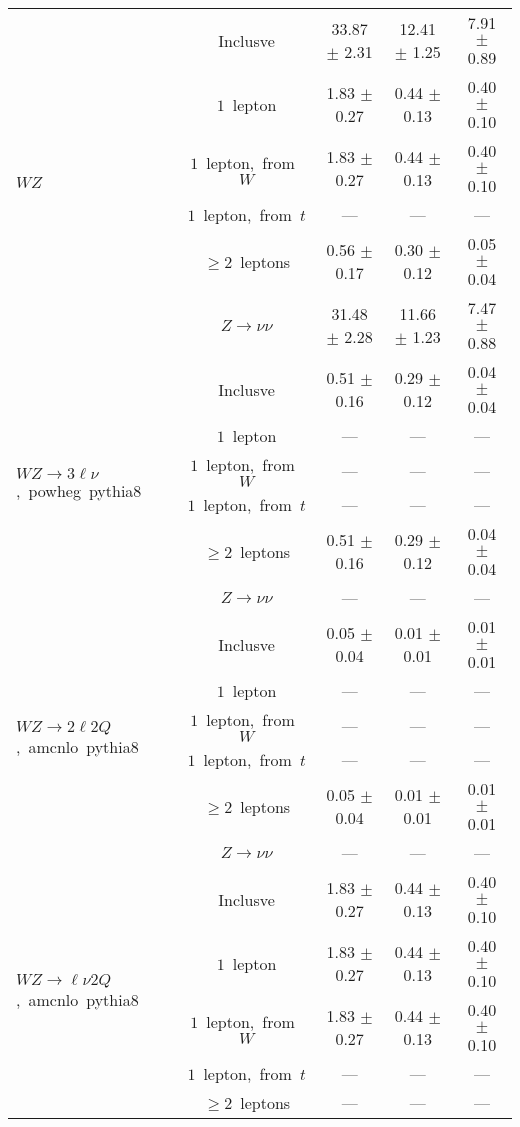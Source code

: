 \documentclass{article}
\begin{document}
\begin{longtable}{|l|c|c|c|c|}
\multirow{6}{*}{$WZ$} & Inclusve  & 33.87 $\pm$ 2.31  & 12.41 $\pm$ 1.25  & 7.91 $\pm$ 0.89 \\* 
 & $1$~lepton  & 1.83 $\pm$ 0.27  & 0.44 $\pm$ 0.13  & 0.40 $\pm$ 0.10 \\* 
 & $1$~lepton,~from~$W$  & 1.83 $\pm$ 0.27  & 0.44 $\pm$ 0.13  & 0.40 $\pm$ 0.10 \\* 
 & $1$~lepton,~from~$t$  & ---  & ---  & --- \\* 
 & $\ge2$~leptons  & 0.56 $\pm$ 0.17  & 0.30 $\pm$ 0.12  & 0.05 $\pm$ 0.04 \\* 
 & $Z\rightarrow\nu\nu$  & 31.48 $\pm$ 2.28  & 11.66 $\pm$ 1.23  & 7.47 $\pm$ 0.88 \\* 
\hline 
\multirow{6}{*}{$WZ{\rightarrow}3\ell\nu$,~powheg~pythia8} & Inclusve  & 0.51 $\pm$ 0.16  & 0.29 $\pm$ 0.12  & 0.04 $\pm$ 0.04 \\* 
 & $1$~lepton  & ---  & ---  & --- \\* 
 & $1$~lepton,~from~$W$  & ---  & ---  & --- \\* 
 & $1$~lepton,~from~$t$  & ---  & ---  & --- \\* 
 & $\ge2$~leptons  & 0.51 $\pm$ 0.16  & 0.29 $\pm$ 0.12  & 0.04 $\pm$ 0.04 \\* 
 & $Z\rightarrow\nu\nu$  & ---  & ---  & --- \\* 
\hline 
\multirow{6}{*}{$WZ{\rightarrow}2{\ell}2Q$,~amcnlo~pythia8} & Inclusve  & 0.05 $\pm$ 0.04  & 0.01 $\pm$ 0.01  & 0.01 $\pm$ 0.01 \\* 
 & $1$~lepton  & ---  & ---  & --- \\* 
 & $1$~lepton,~from~$W$  & ---  & ---  & --- \\* 
 & $1$~lepton,~from~$t$  & ---  & ---  & --- \\* 
 & $\ge2$~leptons  & 0.05 $\pm$ 0.04  & 0.01 $\pm$ 0.01  & 0.01 $\pm$ 0.01 \\* 
 & $Z\rightarrow\nu\nu$  & ---  & ---  & --- \\* 
\hline 
\multirow{6}{*}{$WZ{\rightarrow}{\ell}{\nu}2Q$,~amcnlo~pythia8} & Inclusve  & 1.83 $\pm$ 0.27  & 0.44 $\pm$ 0.13  & 0.40 $\pm$ 0.10 \\* 
 & $1$~lepton  & 1.83 $\pm$ 0.27  & 0.44 $\pm$ 0.13  & 0.40 $\pm$ 0.10 \\* 
 & $1$~lepton,~from~$W$  & 1.83 $\pm$ 0.27  & 0.44 $\pm$ 0.13  & 0.40 $\pm$ 0.10 \\* 
 & $1$~lepton,~from~$t$  & ---  & ---  & --- \\* 
 & $\ge2$~leptons  & ---  & ---  & --- \\* 

\end{longtable}
\end{document}
